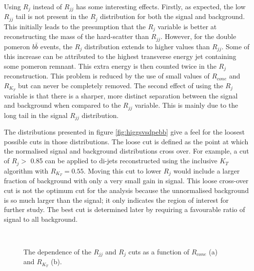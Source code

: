 Using $R_j$ instead of $R_{jj}$ has some interesting effects. Firstly, as expected, the low $R_{jj}$ tail is not present in the $R_j$ distribution for both the signal and background. This initially leads to the presumption that the $R_j$ variable is better at reconstructing the mass of the hard-scatter than $R_{jj}$. However, for the double pomeron $b\bar{b}$ events, the $R_j$ distribution extends to higher values than $R_{jj}$. Some of this increase can be attributed to the highest transverse energy jet containing some pomeron remnant. This extra energy is then counted twice in the $R_j$ reconstruction. This problem is reduced by the use of small values of $R_{cone}$ and $R_{K_T}$ but can never be completely removed.
The second effect of using the $R_j$ variable is that there is a sharper, more distinct separation between the signal and background when compared to the $R_{jj}$ variable. This is mainly due to the long tail in the signal $R_{jj}$ distribution. 


The distributions presented in figure \ref{fig:higgsvsdpebb} give a feel for the loosest possible cuts in those distributions. The loose cut is defined as the point at which the normalised signal and background distributions cross over. For example, a cut of $R_j >$ 0.85 can be applied to di-jets reconstructed using the inclusive $K_T$ algorithm with $R_{K_T}=0.55$. Moving this cut to lower $R_j$ would include a larger fraction of background with only a very small gain in signal. This loose cross-over cut is not the optimum cut for the analysis because the unnormalised background is so much larger than the signal; it only indicates the region of interest for further study. The best cut is determined later by requiring a favourable ratio of signal to all background.

\begin{figure}
\centering
\mbox{ 
	}
\caption[The dependence of the $R_{jj}$ and $R_{j}$ cuts on $R_{cone}$ and $R_{K_T}$]{The dependence of the $R_{jj}$ and $R_{j}$ cuts as a function of $R_{cone}$ (a) and $R_{K_T}$ (b).\label{dijetmasscutsvsparam}}
\end{figure}

